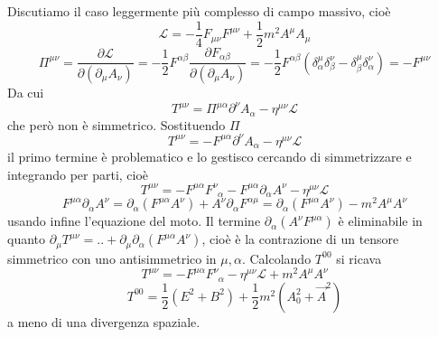 \documentclass[12pt,oneside,notitlepage,abstracton,a4paper]{scrartcl}
\renewcommand{\L}{\mathcal{L}}
\begin{document}
Discutiamo il caso leggermente più complesso di campo massivo, cioè
\[ \L = -\dfrac{1}{4} F_{\mu\nu} F^{\mu\nu} + \dfrac{1}{2} m^2 A^\mu A_\mu \]
\[ \Pi^{\mu\nu} = \dfrac{\partial \L}{\partial(\partial_\mu A_\nu)} = -\dfrac{1}{2} F^{\alpha\beta} \dfrac{\partial F_{\alpha\beta}}{\partial(\partial_\mu A_\nu)} = -\dfrac{1}{2} F^{\alpha\beta} (\delta^\mu_\alpha\delta^\nu_\beta - \delta^\mu_\beta\delta^\nu_\alpha) = - F^{\mu\nu} \]
Da cui
\[ T^{\mu\nu} = \Pi^{\mu\alpha}\partial^\nu A_\alpha - \eta^{\mu\nu} \L \]
che però non è simmetrico. Sostituendo $\Pi$
\[ T^{\mu\nu} = -F^{\mu\alpha}\partial^\nu A_\alpha - \eta^{\mu\nu} \L \]
il primo termine è problematico e lo gestisco cercando di simmetrizzare e integrando per parti, cioè
\[ T^{\mu\nu} = -F^{\mu\alpha}F^\nu_{\enspace\alpha} - F^{\mu\alpha}\partial_\alpha A^\nu -\eta^{\mu\nu} \L \]
\[ F^{\mu\alpha}\partial_\alpha A^\nu = \partial_\alpha(F^{\mu\alpha} A^\nu) + A^\nu \partial_\alpha F^{\alpha \mu} = \partial_\alpha(F^{\mu\alpha} A^\nu) - m^2 A^\mu A^\nu \]
usando infine l'equazione del moto. Il termine $\partial_\alpha(A^\nu F^{\mu\alpha})$ è eliminabile in quanto $\partial_\mu T^{\mu\nu} = .. + \partial_\mu\partial_\alpha(F^{\mu\alpha}A^\nu)$, cioè è la contrazione di un tensore simmetrico con uno antisimmetrico in $\mu,\alpha$. Calcolando $T^{00}$ si ricava
\[ T^{\mu\nu} = -F^{\mu\alpha} F^\nu_{\enspace\alpha} - \eta^{\mu\nu} \L + m^2 A^\mu A^\nu \]
\[ T^{00} = \dfrac{1}{2}(E^2+B^2) + \dfrac{1}{2} m^2 (A_0^2 + \vec{A}^2) \]
a meno di una divergenza spaziale.
\end{document}
